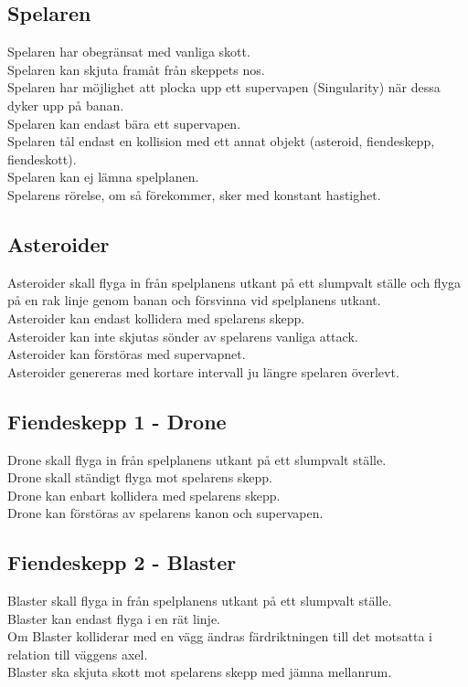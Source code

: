 \documentclass{TDP003mall}
\begin{document}
\subsection{Spelaren}
Spelaren har obegränsat med vanliga skott. \\
Spelaren kan skjuta framåt från skeppets nos. \\
Spelaren har möjlighet att plocka upp ett supervapen (Singularity) när dessa dyker upp på banan. \\
Spelaren kan endast bära ett supervapen. \\
Spelaren tål endast en kollision med ett annat objekt (asteroid, fiendeskepp, fiendeskott). \\
Spelaren kan ej lämna spelplanen. \\
Spelarens rörelse, om så förekommer, sker med konstant hastighet. \\

\subsection{Asteroider}
Asteroider skall flyga in från spelplanens utkant på ett slumpvalt ställe och flyga på en rak linje
 genom banan och försvinna vid spelplanens utkant. \\
Asteroider kan endast kollidera med spelarens skepp. \\
Asteroider kan inte skjutas sönder av spelarens vanliga attack. \\
Asteroider kan förstöras med supervapnet. \\
Asteroider genereras med kortare intervall ju längre spelaren överlevt. \\

\subsection{Fiendeskepp 1 - Drone}
Drone skall flyga in från spelplanens utkant på ett slumpvalt ställe. \\
Drone skall ständigt flyga mot spelarens skepp. \\
Drone kan enbart kollidera med spelarens skepp. \\
Drone kan förstöras av spelarens kanon och supervapen. \\

\subsection{Fiendeskepp 2 - Blaster}
Blaster skall flyga in från spelplanens utkant på ett slumpvalt ställe. \\
Blaster kan endast flyga i en rät linje. \\
Om Blaster kolliderar med en vägg ändras färdriktningen till det motsatta
i relation till väggens axel. \\
Blaster ska skjuta skott mot spelarens skepp med jämna mellanrum. \\
\end{document}
